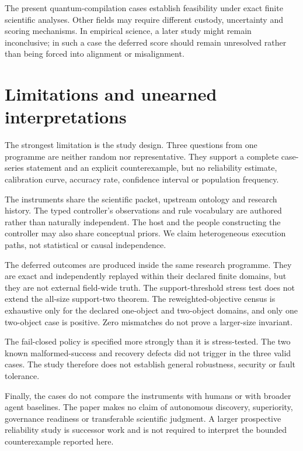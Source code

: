 \documentclass[10pt]{article}
\begin{document}
The present quantum-compilation cases establish feasibility under exact finite scientific analyses. Other fields may require different custody, uncertainty and scoring mechanisms. In empirical science, a later study might remain inconclusive; in such a case the deferred score should remain unresolved rather than being forced into alignment or misalignment.

\section{Limitations and unearned interpretations}

The strongest limitation is the study design. Three questions from one programme are neither random nor representative. They support a complete case-series statement and an explicit counterexample, but no reliability estimate, calibration curve, accuracy rate, confidence interval or population frequency.

The instruments share the scientific packet, upstream ontology and research history. The typed controller's observations and rule vocabulary are authored rather than naturally independent. The host and the people constructing the controller may also share conceptual priors. We claim heterogeneous execution paths, not statistical or causal independence.

The deferred outcomes are produced inside the same research programme. They are exact and independently replayed within their declared finite domains, but they are not external field-wide truth. The support-threshold stress test does not extend the all-size support-two theorem. The reweighted-objective census is exhaustive only for the declared one-object and two-object domains, and only one two-object case is positive. Zero mismatches do not prove a larger-size invariant.

The fail-closed policy is specified more strongly than it is stress-tested. The two known malformed-success and recovery defects did not trigger in the three valid cases. The study therefore does not establish general robustness, security or fault tolerance.

Finally, the cases do not compare the instruments with humans or with broader agent baselines. The paper makes no claim of autonomous discovery, superiority, governance readiness or transferable scientific judgment. A larger prospective reliability study is successor work and is not required to interpret the bounded counterexample reported here.
\end{document}
